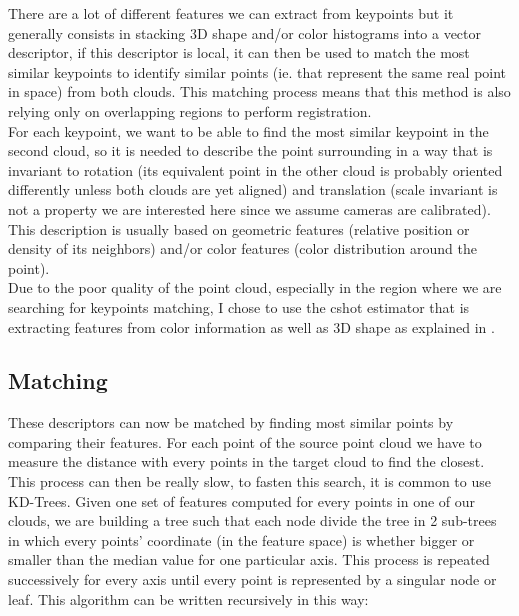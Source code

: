     There are a lot of different features we can extract from keypoints but it generally consists in stacking 3D shape and/or color histograms into a vector descriptor, if this descriptor is local, it can then be used to match the most similar keypoints to identify similar points (ie. that represent the same real point in space) from both clouds. This matching process means that this method is also relying only on overlapping regions to perform registration. \\
    For each keypoint, we want to be able to find the most similar keypoint in the second cloud, so it is needed to describe the point surrounding in a way that is invariant to rotation (its equivalent point in the other cloud is probably oriented differently unless both clouds are yet aligned) and translation (scale invariant is not a property we are interested here since we assume cameras are calibrated). This description is usually based on geometric features (relative position or density of its neighbors) and/or color features (color distribution around the point). \\
    Due to the poor quality of the point cloud, especially in the region where we are searching for keypoints matching, I chose to use the \acrshort{cshot} estimator that is extracting features from color information as well as 3D shape as explained in \cite{tombari2011}.
    
\subsection{Matching}

    These descriptors can now be matched by finding most similar points by comparing their features. For each point of the source point cloud we have to measure the distance with every points in the target cloud to find the closest. \\
    This process can then be really slow, to fasten this search, it is common to use KD-Trees. Given one set of features computed for every points in one of our clouds, we are building a tree such that each node divide the tree in 2 sub-trees in which every points' coordinate (in the feature space) is whether bigger or smaller than the median value for one particular axis. This process is repeated successively for every axis until every point is represented by a singular node or leaf. This algorithm can be written recursively in this way:
    
